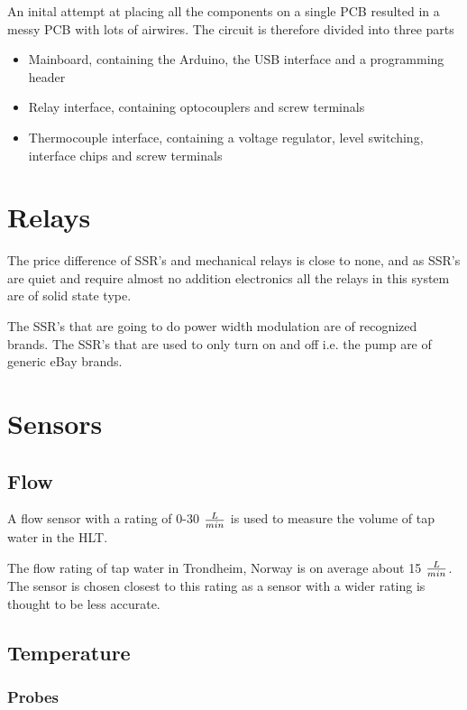 \documentclass[11pt,fleqn,openany]{book} %
\begin{document}
An inital attempt at placing all the components on a single PCB resulted in a messy PCB with lots of airwires. The circuit is therefore divided into three parts

\begin{itemize}
\item Mainboard, containing the Arduino, the USB interface and a programming header
\item Relay interface, containing optocouplers and screw terminals
\item Thermocouple interface, containing a voltage regulator, level switching, interface chips and screw terminals
\end{itemize}

\section{Relays}

The price difference of SSR's and mechanical relays is close to none, and as SSR's are quiet and require almost no addition electronics all the relays in this system are of solid state type.

The SSR's that are going to do power width modulation are of recognized brands. The SSR's that are used to only turn on and off i.e. the pump are of generic eBay brands.

\section{Sensors}

\subsection{Flow}

A flow sensor with a rating of 0-30 $L \over min$ is used to measure the volume of tap water in the HLT.

The flow rating of tap water in Trondheim, Norway is on average about 15 $L \over min$. The sensor is chosen closest to this rating as a sensor with a wider rating is thought to be less accurate.

\subsection{Temperature}

\subsubsection{Probes}
\end{document}
